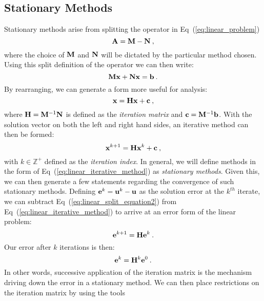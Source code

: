 \subsection{Stationary Methods}
\label{subsec:stationary_methods}
Stationary methods arise from splitting the operator in
Eq~(\ref{eq:linear_problem})
\begin{equation}
  \mathbf{A} = \mathbf{M} - \mathbf{N}\:,
  \label{eq:split_linear_operator}
\end{equation}
where the choice of $\mathbf{M}$ and $\mathbf{N}$ will be dictated by the
particular method chosen. Using this split definition of the operator
we can then write:
\begin{equation}
  \mathbf{M}\mathbf{x} + \mathbf{N}\mathbf{x} = \mathbf{b}\:.
  \label{eq:linear_split_equation1}
\end{equation}
By rearranging, we can generate a form more useful for analysis:
\begin{equation}
  \mathbf{x} = \mathbf{H}\mathbf{x} + \mathbf{c}\:,
  \label{eq:linear_split_equation2}
\end{equation}
where $\mathbf{H}=\mathbf{M}^{-1}\mathbf{N}$ is defined as the \textit{iteration
  matrix} and $\mathbf{c}=\mathbf{M}^{-1}\mathbf{b}$. With the solution vector on
both the left and right hand sides, an iterative method can then be
formed:
\begin{equation}
    \mathbf{x}^{k+1} = \mathbf{H}\mathbf{x}^k + \mathbf{c}\:,
  \label{eq:linear_iterative_method}
\end{equation}
with $k \in \mathbb{Z}^+$ defined as the \textit{iteration index}. In
general, we will define methods in the form of
Eq~(\ref{eq:linear_iterative_method}) as \textit{stationary
  methods}. Given this, we can then generate a few statements
regarding the convergence of such stationary methods. Defining
$\mathbf{e}^k = \mathbf{u}^k - \mathbf{u}$ as the solution error at the
$k^{th}$ iterate, we can subtract Eq~(\ref{eq:linear_split_equation2})
from Eq~(\ref{eq:linear_iterative_method}) to arrive at an error form
of the linear problem:
\begin{equation}
  \mathbf{e}^{k+1} = \mathbf{H}\mathbf{e}^k\:. 
  \label{eq:linear_iterative_error}
\end{equation}
Our error after $k$ iterations is then:
\begin{equation}
  \mathbf{e}^{k} = \mathbf{H}^k\mathbf{e}^0\:. 
  \label{eq:linear_k_iter_error}
\end{equation}
In other words, successive application of the iteration matrix is the
mechanism driving down the error in a stationary method. We can then
place restrictions on the iteration matrix by using the tools
